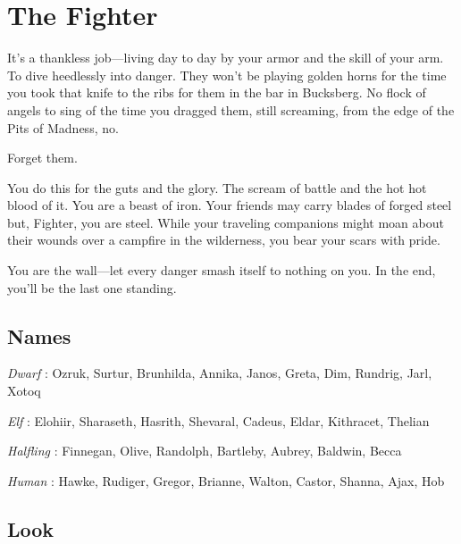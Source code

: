\chapter{The Fighter}
  
            

         

It’s a thankless job—living day to day by your armor and the skill of your arm. To dive heedlessly into danger. They won’t be playing golden horns for the time you took that knife to the ribs for them in the bar in Bucksberg. No flock of angels to sing of the time you dragged them, still screaming, from the edge of the Pits of Madness, no.

         

Forget them.

         

You do this for the guts and the glory. The scream of battle and the hot hot blood of it. You are a beast of iron. Your friends may carry blades of forged steel but, Fighter, you are steel. While your traveling companions might moan about their wounds over a campfire in the wilderness, you bear your scars with pride.

         

You are the wall—let every danger smash itself to nothing on you. In the end, you’ll be the last one standing.

       

       
\section{Names}   
       

         

           {\em Dwarf} : Ozruk, Surtur, Brunhilda, Annika, Janos, Greta, Dim, Rundrig, Jarl, Xotoq

         

           {\em Elf} : Elohiir, Sharaseth, Hasrith, Shevaral, Cadeus, Eldar, Kithracet, Thelian

         

           {\em Halfling} : Finnegan, Olive, Randolph, Bartleby, Aubrey, Baldwin, Becca

         

           {\em Human} : Hawke, Rudiger, Gregor, Brianne, Walton, Castor, Shanna, Ajax, Hob

       

       
\section{Look}  
       

